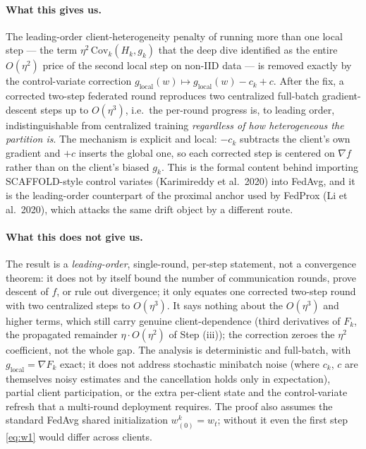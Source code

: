 \documentclass[11pt]{article}
\theoremstyle{definition}
\theoremstyle{remark}
\begin{document}
\paragraph{What this gives us.}
The leading-order client-heterogeneity penalty of running more than one local step --- the term
$\eta^2\,\mathrm{Cov}_k(H_k,g_k)$ that the deep dive identified as the entire $O(\eta^2)$ price
of the second local step on non-IID data --- is removed exactly by the control-variate
correction $g_{\mathrm{local}}(w)\mapsto g_{\mathrm{local}}(w)-c_k+c$. After the fix, a
corrected two-step federated round reproduces two centralized full-batch gradient-descent steps
up to $O(\eta^3)$, i.e.\ the per-round progress is, to leading order, indistinguishable from
centralized training \emph{regardless of how heterogeneous the partition is}. The mechanism is
explicit and local: $-c_k$ subtracts the client's own gradient and $+c$ inserts the global one,
so each corrected step is centered on $\nabla f$ rather than on the client's biased $g_k$. This
is the formal content behind importing SCAFFOLD-style control variates (Karimireddy et al.\
2020) into FedAvg, and it is the leading-order counterpart of the proximal anchor used by
FedProx (Li et al.\ 2020), which attacks the same drift object by a different route.

\paragraph{What this does not give us.}
The result is a \emph{leading-order}, single-round, per-step statement, not a convergence
theorem: it does not by itself bound the number of communication rounds, prove descent of $f$,
or rule out divergence; it only equates one corrected two-step round with two centralized steps
to $O(\eta^3)$. It says nothing about the $O(\eta^3)$ and higher terms, which still carry
genuine client-dependence (third derivatives of $F_k$, the propagated remainder
$\eta\cdot O(\eta^2)$ of Step (iii)); the correction zeroes the $\eta^2$ coefficient, not the
whole gap. The analysis is deterministic and full-batch, with $g_{\mathrm{local}}=\nabla F_k$
exact; it does not address stochastic minibatch noise (where $c_k$, $c$ are themselves noisy
estimates and the cancellation holds only in expectation), partial client participation, or the
extra per-client state and the control-variate refresh that a multi-round deployment requires.
The proof also assumes the standard FedAvg shared initialization $w^{k}_{(0)}=w_t$; without it
even the first step \eqref{eq:w1} would differ across clients.
\end{document}
